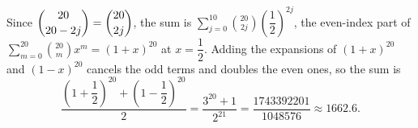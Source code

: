 Since $\dbinom{20}{20-2j}=\dbinom{20}{2j}$, the sum is $\displaystyle\sum_{j=0}^{10}\binom{20}{2j}\left(\dfrac12\right)^{2j}$, the even-index part of $\displaystyle\sum_{m=0}^{20}\binom{20}{m}x^m=(1+x)^{20}$ at $x=\dfrac12$. Adding the expansions of $(1+x)^{20}$ and $(1-x)^{20}$ cancels the odd terms and doubles the even ones, so the sum is
\[\dfrac{\left(1+\dfrac12\right)^{20}+\left(1-\dfrac12\right)^{20}}{2}=\boxed{\dfrac{3^{20}+1}{2^{21}}}=\dfrac{1743392201}{1048576}\approx1662.6.\]

